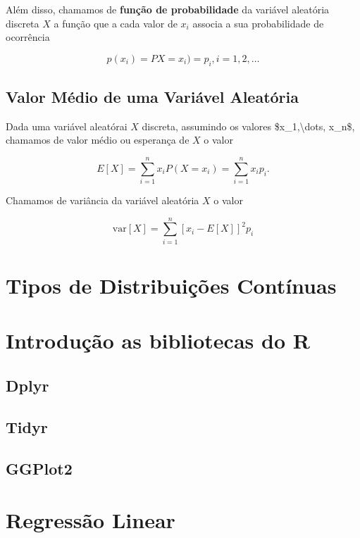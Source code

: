 \documentclass[
]{book}
\begin{document}
Além disso, chamamos de \textbf{função de probabilidade} da variável aleatória discreta \(X\) a função que a cada valor de \(x_i\) associa a sua probabilidade de ocorrência

\[
p(x_i) = PX=x_i) = p_i, i =1, 2, \dots
\]

\hypertarget{valor-muxe9dio-de-uma-variuxe1vel-aleatuxf3ria}{%
\section{Valor Médio de uma Variável Aleatória}\label{valor-muxe9dio-de-uma-variuxe1vel-aleatuxf3ria}}

Dada uma variável aleatórai \(X\) discreta, assumindo os valores \$x\_1,\textbackslash dots, x\_n\$, chamamos de valor médio ou esperança de \(X\) o valor

\[
E[X] = \sum_{i=1}^n x_i P(X=x_i) = \sum_{i=1}^n x_i p_i.
\]

Chamamos de variância da variável aleatória \(X\) o valor

\[
\text{var}[X] = \sum_{i=1}^n [x_i - E[X]]^2 p_i
\]

\hypertarget{tipos-de-distribuiuxe7uxf5es-contuxednuas}{%
\chapter{Tipos de Distribuições Contínuas}\label{tipos-de-distribuiuxe7uxf5es-contuxednuas}}

\hypertarget{introduuxe7uxe3o-as-bibliotecas-do-r}{%
\chapter{Introdução as bibliotecas do R}\label{introduuxe7uxe3o-as-bibliotecas-do-r}}

\hypertarget{dplyr}{%
\section{Dplyr}\label{dplyr}}

\hypertarget{tidyr}{%
\section{Tidyr}\label{tidyr}}

\hypertarget{ggplot2}{%
\section{GGPlot2}\label{ggplot2}}

\hypertarget{regressuxe3o-linear}{%
\chapter{Regressão Linear}\label{regressuxe3o-linear}}

  
\end{document}
